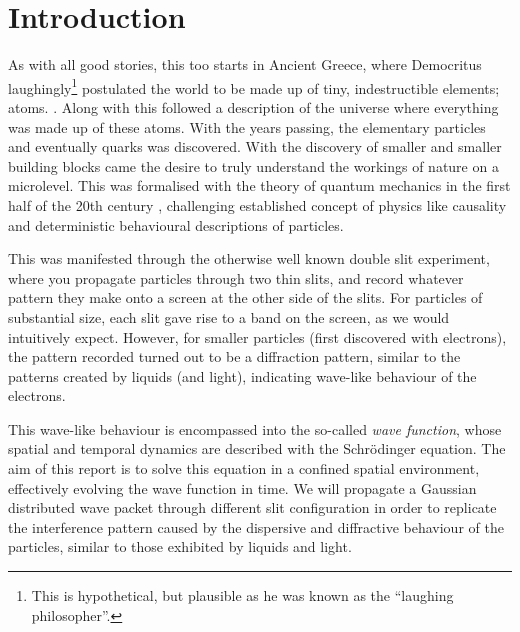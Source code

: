 \section{Introduction}\label{sec:introduction}

As with all good stories, this too starts in Ancient Greece, where Democritus laughingly\footnote{This is hypothetical, but plausible as he was known as the ``laughing philosopher''.} postulated the world to be made up of tiny, indestructible elements; atoms. \citep{berryman_2016}. Along with this followed a description of the universe where everything was made up of these atoms. With the years passing, the elementary particles and eventually quarks was discovered. With the discovery of smaller and smaller building blocks came the desire to truly understand the workings of nature on a microlevel. This was formalised with the theory of quantum mechanics in the first half of the 20th century \citep{QMH}, challenging established concept of physics like causality and deterministic behavioural descriptions of particles. 

This was manifested through the otherwise well known double slit experiment, where you propagate particles through two thin slits, and record whatever pattern they make onto a screen at the other side of the slits. For particles of substantial size, each slit gave rise to a band on the screen, as we would intuitively expect. However, for smaller particles (first discovered with electrons), the pattern recorded turned out to be a diffraction pattern, similar to the patterns created by liquids (and light), indicating wave-like behaviour of the electrons. 

This wave-like behaviour is encompassed into the so-called \textit{wave function}, whose spatial and temporal dynamics are described with the Schrödinger equation. The aim of this report is to solve this equation in a confined spatial environment, effectively evolving the wave function in time. We will propagate a Gaussian distributed wave packet through different slit configuration in order to replicate the interference pattern caused by the dispersive and diffractive behaviour of the particles, similar to those exhibited by liquids and light.

